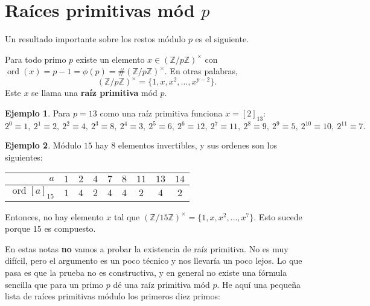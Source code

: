 \documentclass{article}
\newcommand{\ZZ}{\mathbb{Z}}
\DeclareMathOperator{\ord}{ord}
\theoremstyle{definition}
\newtheorem*{ejemplo}{Ejemplo}
\begin{document}

\section{Raíces primitivas mód $p$}

Un resultado importante sobre los restos módulo $p$ es el siguiente.

\begin{framed}
  Para todo primo $p$ existe un elemento $x \in (\ZZ/p\ZZ)^\times$ con
  $\ord (x) = p-1 = \phi(p) = \# (\ZZ/p\ZZ)^\times$. En otras palabras,
  $$(\ZZ/p\ZZ)^\times = \{ 1, x, x^2, \ldots, x^{p-2} \}.$$
  Este $x$ se llama una \textbf{raíz primitiva} mód $p$.
\end{framed}

\begin{ejemplo}
  Para $p = 13$ como una raíz primitiva funciona $x = [2]_{13}$:
  \[
    2^0 \equiv 1, ~
    2^1 \equiv 2, ~
    2^2 \equiv 4, ~
    2^3 \equiv 8, ~
    2^4 \equiv 3, ~
    2^5 \equiv 6, ~
    2^6 \equiv 12, ~
    2^7 \equiv 11, ~
    2^8 \equiv 9, ~
    2^9 \equiv 5, ~
    2^{10} \equiv 10, ~
    2^{11} \equiv 7.
  \]
\end{ejemplo}

\begin{ejemplo}
  Módulo $15$ hay $8$ elementos invertibles, y sus ordenes son los siguientes:
  \begin{center}
    \begin{tabular}{rcccccccc}
      \hline
      $a$ & $1$ & $2$ & $4$ & $7$ & $8$ & $11$ & $13$ & $14$ \\
      \hline
      $\ord [a]_{15}$ & $1$ & $4$ & $2$ & $4$ & $4$ & $2$ & $4$ & $2$ \\
      \hline
    \end{tabular}
  \end{center}
  Entonces, no hay elemento $x$ tal que
  $(\ZZ/15\ZZ)^\times = \{ 1, x, x^2, \ldots, x^7 \}$.
  Esto sucede porque $15$ es compuesto.
\end{ejemplo}

En estas notas \textbf{no} vamos a probar la existencia de raíz primitiva.
No es muy difícil, pero el argumento es un poco técnico y nos llevaría un poco
lejos. Lo que pasa es que la prueba no es constructiva, y en general no existe
una fórmula sencilla que para un primo $p$ dé una raíz primitiva mód $p$.
He aquí una pequeña lista de raíces primitivas módulo los primeros diez primos:
\end{document}
